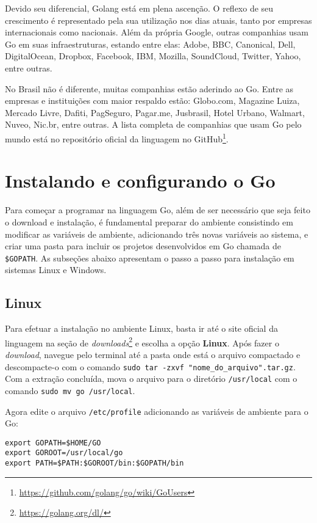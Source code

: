 \documentclass{SBCbookchapter}
\begin{document}
Devido seu diferencial, Golang está em plena ascenção. O reflexo de seu crescimento é representado pela sua utilização nos dias atuais, tanto por empresas internacionais como nacionais. Além da própria Google, outras companhias usam Go em suas infraestruturas, estando entre elas: Adobe, BBC, Canonical, Dell, DigitalOcean, Dropbox, Facebook, IBM, Mozilla, SoundCloud, Twitter, Yahoo, entre outras.

No Brasil não é diferente, muitas companhias estão aderindo ao Go. Entre as empresas e instituições com maior respaldo estão: Globo.com, Magazine Luiza, Mercado Livre, Dafiti, PagSeguro, Pagar.me, Jusbrasil, Hotel Urbano, Walmart, Nuveo, Nic.br, entre outras. A lista completa de companhias que usam Go pelo mundo está no repositório oficial da linguagem no GitHub\footnote{\url{https://github.com/golang/go/wiki/GoUsers}}.

\section{Instalando e configurando o Go}

Para começar a programar na linguagem Go, além de ser necessário que seja feito o download e instalação, é fundamental preparar do ambiente consistindo em modificar as variáveis de ambiente, adicionando três novas variáveis ao sistema, e criar uma pasta para incluir os projetos desenvolvidos em Go chamada de \texttt{\$GOPATH}. As subseções abaixo apresentam o passo a passo para instalação em sistemas Linux e Windows.

\subsection{Linux}

Para efetuar a instalação no ambiente Linux, basta ir até o site oficial da linguagem na seção de \textit{downloads}\footnote{\label{note1}\url{https://golang.org/dl/}} e escolha a opção \textbf{Linux}. Após fazer o \textit{download}, navegue pelo terminal até a pasta onde está o arquivo compactado e descompacte-o com o comando \texttt{sudo tar -zxvf "nome\_do\_arquivo".tar.gz}. Com a extração concluída, mova o arquivo para o diretório \texttt{/usr/local} com o comando \texttt{sudo mv go /usr/local}.

Agora edite o arquivo \texttt{/etc/profile} adicionando as variáveis de ambiente para o Go:

\noindent\texttt{export GOPATH=\$HOME/GO}\\
\texttt{export GOROOT=/usr/local/go}\\
\texttt{export PATH=\$PATH:\$GOROOT/bin:\$GOPATH/bin}
\end{document}
